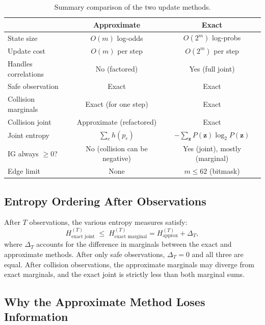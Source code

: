 \documentclass[11pt]{article}
\begin{document}
\begin{table}[h]
\centering
\begin{tabular}{@{}lcc@{}}
\toprule
                        & \textbf{Approximate}             & \textbf{Exact} \\
\midrule
State size              & $O(m)$ log-odds                  & $O(2^m)$ log-probs \\
Update cost             & $O(m)$ per step                  & $O(2^m)$ per step \\
Handles correlations    & No (factored)                    & Yes (full joint) \\
Safe observation        & Exact                            & Exact \\
Collision marginals     & Exact (for one step)             & Exact \\
Collision joint         & Approximate (refactored)         & Exact \\
Joint entropy           & $\sum_e h(p_e)$                  & $-\sum_{\mathbf{z}} P(\mathbf{z})\log_2 P(\mathbf{z})$ \\
IG always $\geq 0$?    & No (collision can be negative)   & Yes (joint), mostly (marginal) \\
Edge limit              & None                             & $m \leq 62$ (bitmask) \\
\bottomrule
\end{tabular}
\caption{Summary comparison of the two update methods.}
\label{tab:comparison}
\end{table}

\subsection{Entropy Ordering After Observations}

After $T$ observations, the various entropy measures satisfy:
\begin{equation}
  H_{\text{exact joint}}^{(T)}
  \;\leq\;
  H_{\text{exact marginal}}^{(T)}
  = H_{\text{approx}}^{(T)} + \Delta_T,
  \label{eq:entropy-ordering}
\end{equation}
where $\Delta_T$ accounts for the difference in marginals between the
exact and approximate methods.  After only safe observations,
$\Delta_T = 0$ and all three are equal.  After collision observations,
the approximate marginals may diverge from exact marginals, and
the exact joint is strictly less than both marginal sums.

\subsection{Why the Approximate Method Loses Information}
\end{document}

